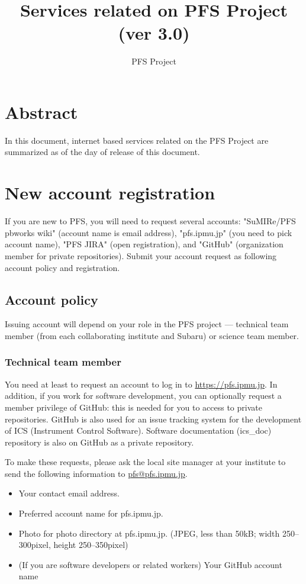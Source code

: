 \documentclass[a4paper,notitlepage]{article}
\title{Services related on PFS Project (ver 3.0)}
\author{PFS Project}
\begin{document}
\maketitle
\tableofcontents

\section{Abstract}

In this document, internet based services related on the PFS Project are summarized 
as of the day of release of this document. 

\section{New account registration}

If you are new to PFS, you will need to request several accounts: 
"SuMIRe/PFS pbworks wiki" (account name is email address), 
"pfs.ipmu.jp" (you need to pick account name), 
"PFS JIRA" (open registration), and 
"GitHub" (organization member for private repositories). 
Submit your account request as following account policy and registration. 

\subsection{Account policy}

Issuing account will depend on your role in the PFS project --- 
technical team member (from each collaborating institute and Subaru) 
or science team member. 

\subsubsection{Technical team member}

You need at least to request an account to log in to \url{https://pfs.ipmu.jp}.
In addition, if you work for software development, you can optionally 
request a member privilege of GitHub: this is needed for you to access 
to private repositories. 
GitHub is also used for an issue tracking system for the development of 
ICS (Instrument Control Software). Software documentation (ics\_doc) 
repository is also on GitHub as a private repository. 

To make these requests, please ask the local site manager at your institute 
to send the following information to \url{pfs@pfs.ipmu.jp}. 

\begin{itemize}
  \item Your contact email address.
  \item Preferred account name for pfs.ipmu.jp.
  \item Photo for photo directory at pfs.ipmu.jp. (JPEG, less than 50kB; width 
    250--300pixel, height 250--350pixel)
  \item (If you are software developers or related workers) Your GitHub account name
\end{itemize}
\end{document}
